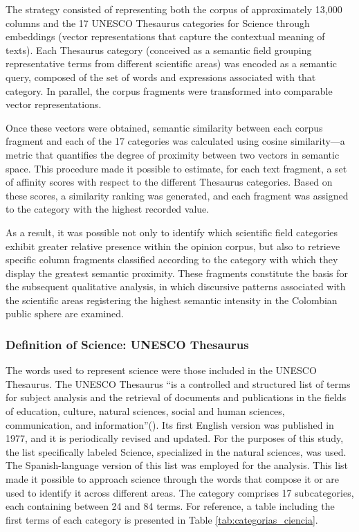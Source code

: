 \documentclass[11pt,a4paper]{article}
\begin{document}
The strategy consisted of representing both the corpus of approximately 13,000 columns and the 17 UNESCO Thesaurus categories for Science through embeddings (vector representations that capture the contextual meaning of texts). Each Thesaurus category (conceived as a semantic field grouping representative terms from different scientific areas) was encoded as a semantic query, composed of the set of words and expressions associated with that category. In parallel, the corpus fragments were transformed into comparable vector representations.


Once these vectors were obtained, semantic similarity between each corpus fragment and each of the 17 categories was calculated using cosine similarity—a metric that quantifies the degree of proximity between two vectors in semantic space. This procedure made it possible to estimate, for each text fragment, a set of affinity scores with respect to the different Thesaurus categories. Based on these scores, a similarity ranking was generated, and each fragment was assigned to the category with the highest recorded value.

As a result, it was possible not only to identify which scientific field categories exhibit greater relative presence within the opinion corpus, but also to retrieve specific column fragments classified according to the category with which they display the greatest semantic proximity. These fragments constitute the basis for the subsequent qualitative analysis, in which discursive patterns associated with the scientific areas registering the highest semantic intensity in the Colombian public sphere are examined.
	
\subsubsection{Definition of Science: UNESCO Thesaurus}

The words used to represent science were those included in the UNESCO Thesaurus. The UNESCO Thesaurus ``is a controlled and structured list of terms for subject analysis and the retrieval of documents and publications in the fields of education, culture, natural sciences, social and human sciences, communication, and information''(\cite{unesco_thesaurus_1977}). Its first English version was published in 1977, and it is periodically revised and updated. For the purposes of this study, the list specifically labeled Science, specialized in the natural sciences, was used. The Spanish-language version of this list was employed for the analysis. This list made it possible to approach science through the words that compose it or are used to identify it across different areas. The category comprises 17 subcategories, each containing between 24 and 84 terms. For reference, a table including the first terms of each category is presented in Table \ref{tab:categorias_ciencia}.
\end{document}

